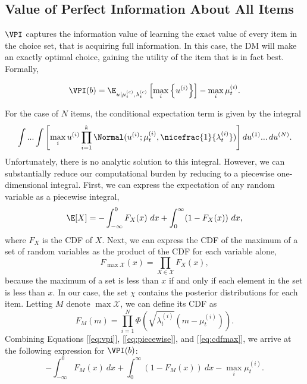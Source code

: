 \subsection{Value of Perfect Information About All Items}
$\VPI$ captures the information value of learning the exact value of every item in the choice set, that is acquiring full information. In this case, the DM will make an exactly optimal choice, gaining the utility of the item that is in fact best. Formally,

\begin{equation}
  \label{eq:vpi}
  \VPI(b)=\E_{u \mid \currentmean, \currentlam} \left[
    \max_{i}\left\{ u^{(i)}\right\}
  \right] -\max_{i}\mu_t^{(i)}.
\end{equation}
%

For the case of $N$ items, the conditional expectation term is given by the integral
%
\begin{equation*}
  \int...\int\left[\max_{i}u^{(i)}\prod_{i=1}^{k}\Normal(u^{(i)};\mu_t^{(i)},\nicefrac{1}{\lambda_t^{(i)}})\right]du^{(1)}...\,du^{(N)}.
\end{equation*}
%
Unfortunately, there is no analytic solution to this integral. However, we can substantially reduce our computational burden by reducing to a piecewise one-dimensional integral. First, we can express the expectation of any random variable as a piecewise integral,
%
\begin{equation}
  \label{eq:piecewise}
  \E[X]=-\int_{-\infty}^{0}F_{X}(x)\ dx+\int_{0}^{\infty}(1-F_{X}(x))\ dx,
\end{equation}
%
where $F_{X}$ is the CDF of $X$. Next, we can express the CDF of the maximum of a set of random variables as the product of the CDF for each variable alone,
%
\begin{equation}
  \label{eq:cdfmax}
  F_{\max\mathcal{X}}(x)=\prod_{X\in\mathcal{X}}F_{X}(x),
\end{equation}
%
because the maximum of a set is less than $x$ if and only if each element in the set is less than $x$. In our case, the set $\chi$ contains the posterior distributions for each item.
Letting $M$ denote $\max \mathcal{X}$, we can define its CDF as
%
\begin{equation*}
  F_{M}(m)=\prod_{i=1}^{N}\Phi\left(\sqrt{\lambda_t^{(i)}}\left(m-\mu_t^{(i)}\right)\right).
\end{equation*}
%
Combining Equations [\ref{eq:vpi}], [\ref{eq:piecewise}], and [\ref{eq:cdfmax}], we arrive at the following expression for $\VPI(b)$:
%
\begin{equation*}
  -\int_{-\infty}^{0}F_{M}(x)\ dx 
  + \int_{0}^{\infty}(1-F_{M}(x))\ dx
  -\max_{i}\mu_t^{(i)}.
\end{equation*}

